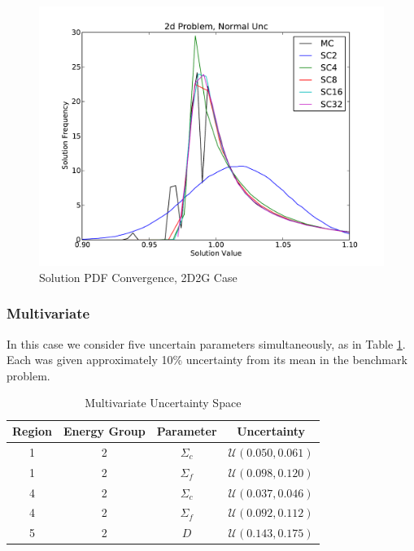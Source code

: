\begin{figure}[H]
\centering
   \includegraphics[width=\textwidth]{../graphics/2d_normal_pdfs}
   \caption{Solution PDF Convergence, 2D2G Case}
   \label{fig:2dcrit}
\end{figure}

\subsubsection{Multivariate}
In this case we consider five uncertain parameters simultaneously, as in Table \ref{tab:2d2g5param}.  Each was given approximately 10\% uncertainty from its mean in the benchmark problem.
\begin{table}
\begin{center}
\begin{tabular}{c c c c}
Region & Energy Group & Parameter & Uncertainty \\ \hline
1 & 2 & $\Sigma_c$ & $\mathcal{U}(0.050,0.061) $\\
1 & 2 & $\Sigma_f$ & $\mathcal{U}(0.098,0.120) $\\
4 & 2 & $\Sigma_c$ & $\mathcal{U}(0.037,0.046) $\\
4 & 2 & $\Sigma_f$ & $\mathcal{U}(0.092,0.112) $\\
5 & 2 & $D$            & $\mathcal{U}(0.143,0.175) $\\
\end{tabular}
\end{center}
\caption{Multivariate Uncertainty Space}
\label{tab:2d2g5param}
\end{table}

